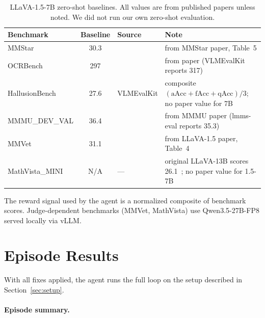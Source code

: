 \begin{table}[H]
\centering
\small
\caption{LLaVA-1.5-7B zero-shot baselines. All values are from published papers unless noted. We did not run our own zero-shot evaluation.}
\label{tab:judge-sanity}
\begin{tabular}{lcll}
\toprule
\textbf{Benchmark} & \textbf{Baseline} & \textbf{Source} & \textbf{Note} \\
\midrule
MMStar & 30.3 & \cite{chen2024mmstar} & from MMStar paper, Table~5 \\
OCRBench & 297 & \cite{liu2023ocrbench} & from paper (VLMEvalKit reports 317) \\
HallusionBench & 27.6 & VLMEvalKit & composite $(\text{aAcc}+\text{fAcc}+\text{qAcc})/3$; no paper value for 7B \\
MMMU\_DEV\_VAL & 36.4 & \cite{yue2024mmmu} & from MMMU paper (lmms-eval reports 35.3) \\
MMVet & 31.1 & \cite{liu2024llava15} & from LLaVA-1.5 paper, Table~4 \\
MathVista\_MINI & N/A & --- & original LLaVA-13B scores 26.1~\cite{lu2024mathvista}; no paper value for 1.5-7B \\
\bottomrule
\end{tabular}
\end{table}

\noindent The reward signal used by the agent is a normalized composite of benchmark scores. Judge-dependent benchmarks (MMVet, MathVista) use Qwen3.5-27B-FP8 served locally via vLLM.



\newpage
\section{Episode Results}

With all fixes applied, the agent runs the full loop on the setup described in Section~\ref{sec:setup}.


\paragraph{Episode summary.}

